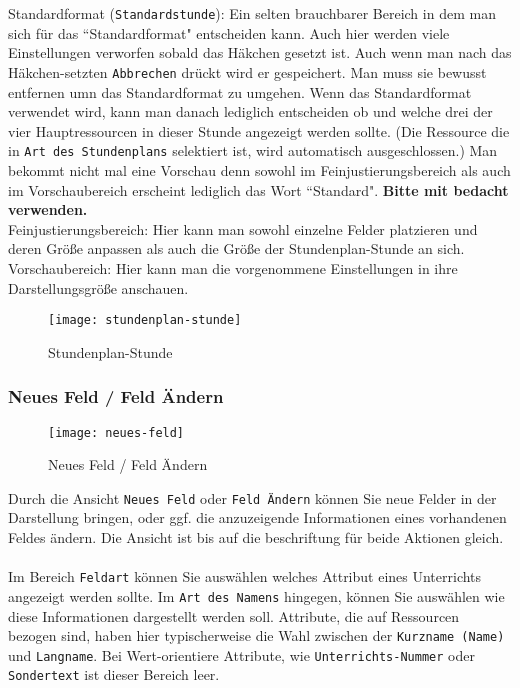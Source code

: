 \noindent
Standardformat (\texttt{Standardstunde}): Ein selten brauchbarer Bereich in dem man sich für das ``Standardformat" \hspace{1pt} entscheiden kann. Auch hier werden viele Einstellungen verworfen sobald das Häkchen gesetzt ist. Auch wenn man nach das Häkchen-setzten \texttt{Abbrechen} drückt wird er gespeichert. Man muss sie bewusst entfernen umn das Standardformat zu umgehen. Wenn das Standardformat verwendet wird, kann man danach lediglich entscheiden ob und welche drei der vier Hauptressourcen in dieser Stunde angezeigt werden sollte. (Die Ressource die in \texttt{Art des Stundenplans} selektiert ist, wird automatisch ausgeschlossen.) Man bekommt nicht mal eine Vorschau denn sowohl im Feinjustierungsbereich als auch im Vorschaubereich erscheint lediglich das Wort ``Standard". \textbf{Bitte mit bedacht verwenden.}\\

\noindent
Feinjustierungsbereich: Hier kann man sowohl einzelne Felder platzieren und deren Größe anpassen als auch die Größe der Stundenplan-Stunde an sich.\\

\noindent
Vorschaubereich: Hier kann man die vorgenommene Einstellungen in ihre Darstellungsgröße anschauen.\\

\begin{figure}[h]
	\centering
	\texttt{[image: stundenplan-stunde]}
	\vspace{-5pt}
	\caption{Stundenplan-Stunde}
	\label{fig:stundenplan-stunde}
\end{figure}

\newpage

\subsubsection{Neues Feld / Feld Ändern}

\begin{wrapfigure}{r}{0.4\textwidth}
	\vspace{-14pt}
	\centering
	\texttt{[image: neues-feld]}
	\vspace{-5pt}
	\caption{Neues Feld / Feld Ändern}
	\label{fig:neues-feld}
	\vspace{-25pt}
\end{wrapfigure}

Durch die Ansicht \texttt{Neues Feld} oder \texttt{Feld Ändern} können Sie neue Felder in der Darstellung bringen, oder ggf. die anzuzeigende Informationen eines vorhandenen Feldes ändern. Die Ansicht ist bis auf die beschriftung für beide Aktionen gleich.\\
\\
Im Bereich \texttt{Feldart} können Sie auswählen welches Attribut eines Unterrichts angezeigt werden sollte. Im \texttt{Art des Namens} hingegen, können Sie auswählen wie diese Informationen dargestellt werden soll. Attribute, die auf Ressourcen bezogen sind, haben hier typischerweise die Wahl zwischen der \texttt{Kurzname (Name)} und \texttt{Langname}. Bei Wert-orientiere Attribute, wie \texttt{Unterrichts-Nummer} oder \texttt{Sondertext} ist dieser Bereich leer.


